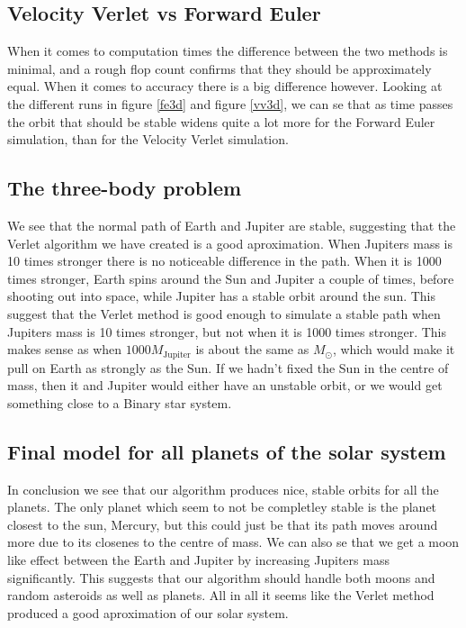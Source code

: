 \documentclass[a4paper]{article}
\begin{document}
\subsection{Velocity Verlet vs Forward Euler}
When it comes to computation times the difference between the two methods is minimal, and a rough flop count confirms that they should be approximately equal. When it comes to accuracy there is a big difference however. Looking at the different runs in figure \ref{fe3d} and figure \ref{vv3d}, we can se that as time passes the orbit that should be stable widens quite a lot more for the Forward Euler simulation, than for the Velocity Verlet simulation.

\subsection{The three-body problem}
We see that the normal path of Earth and Jupiter are stable, suggesting that the Verlet algorithm we have created is a good aproximation. When Jupiters mass is 10 times stronger there is no noticeable difference in the path. When it is 1000 times stronger, Earth spins around the Sun and Jupiter a couple of times, before shooting out into space, while Jupiter has a stable orbit around the sun. This suggest that the Verlet method is good enough to simulate a stable path when Jupiters mass is 10 times stronger, but not when it is 1000 times stronger. This makes sense as when $1000M_{\text{Jupiter}}$ is about the same as $M_{\odot}$, which would make it pull on Earth as strongly as the Sun. If we hadn't fixed the Sun in the centre of mass, then it and Jupiter would either have an unstable orbit, or we would get something close to a Binary star system.

\subsection{Final model for all planets of the solar system}
In conclusion we see that our algorithm produces nice, stable orbits for all the planets. The only planet which seem to not be completley stable is the planet closest to the sun, Mercury, but this could just be that its path moves around more due to its closenes to the centre of mass. We can also se that we get a moon like effect between the Earth and Jupiter by increasing Jupiters mass significantly. This suggests that our algorithm should handle both moons and random asteroids as well as planets. All in all it seems like the Verlet method produced a good aproximation of our solar system.
\end{document}
